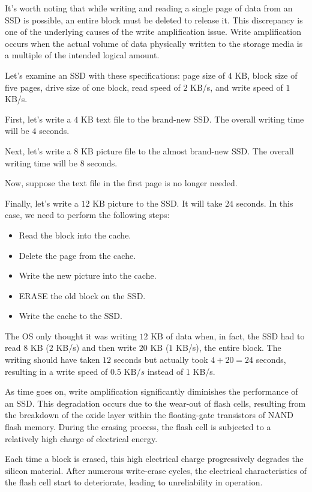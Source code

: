 It's worth noting that while writing and reading a single page of data from an SSD is possible, an entire block must be deleted to release it.
This discrepancy is one of the underlying causes of the write amplification issue. 
Write amplification occurs when the actual volume of data physically written to the storage media is a multiple of the intended logical amount.
\begin{example}
    Let's examine an SSD with these specifications: page size of $4\text{ KB}$, block size of five pages, drive size of one block, read speed of $2$ KB/s, and write speed of $1$ KB/s.
    
    First, let's write a $4\text{ KB}$ text file to the brand-new SSD.
    The overall writing time will be $4$ seconds.

    Next, let's write a $8\text{ KB}$ picture file to the almost brand-new SSD.
    The overall writing time will be $8$ seconds.

    Now, suppose the text file in the first page is no longer needed.

    Finally, let's write a $12\text{ KB}$ picture to the SSD.
    It will take $24$ seconds. 
    In this case, we need to perform the following steps:
    \begin{itemize}
        \item Read the block into the cache.
        \item Delete the page from the cache.
        \item Write the new picture into the cache.
        \item ERASE the old block on the SSD.
        \item Write the cache to the SSD.
    \end{itemize}
    The OS only thought it was writing $12\text{ KB}$ of data when, in fact, the SSD had to read $8\text{ KB}$ ($2$ KB/s) and then write $20\text{ KB}$ ($1$ KB/s), the entire block.
    The writing should have taken $12$ seconds but actually took $4 + 20 = 24$ seconds, resulting in a write speed of $0.5\text{ KB}/s$ instead of $1$ KB/s.
\end{example}
As time goes on, write amplification significantly diminishes the performance of an SSD. 
This degradation occurs due to the wear-out of flash cells, resulting from the breakdown of the oxide layer within the floating-gate transistors of NAND flash memory. 
During the erasing process, the flash cell is subjected to a relatively high charge of electrical energy.

Each time a block is erased, this high electrical charge progressively degrades the silicon material. 
After numerous write-erase cycles, the electrical characteristics of the flash cell start to deteriorate, leading to unreliability in operation.

